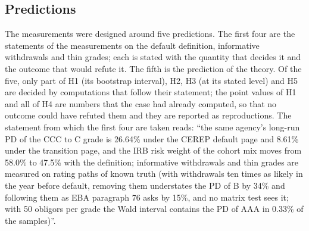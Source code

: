 \subsection{Predictions}
\label{sec:design-hypotheses}

The measurements were designed around five predictions. The first four are the statements of the measurements on the default definition, informative withdrawals and thin grades; each is stated with the quantity that decides it and the outcome that would refute it. The fifth is the prediction of the theory. Of the five, only part of H1 (its bootstrap interval), H2, H3 (at its stated level) and H5 are decided by computations that follow their statement; the point values of H1 and all of H4 are numbers that the case had already computed, so that no outcome could have refuted them and they are reported as reproductions. The statement from which the first four are taken reads: ``the same agency's long-run PD of the CCC to C grade is 26.64\% under the CEREP default page and 8.61\% under the transition page, and the IRB risk weight of the cohort mix moves from 58.0\% to 47.5\% with the definition; informative withdrawals and thin grades are measured on rating paths of known truth (with withdrawals ten times as likely in the year before default, removing them understates the PD of B by 34\% and following them as EBA paragraph 76 asks by 15\%, and no matrix test sees it; with 50 obligors per grade the Wald interval contains the PD of AAA in 0.33\% of the samples)''.
